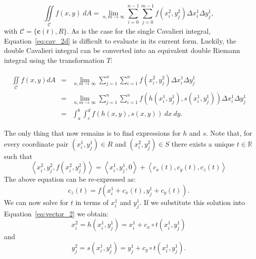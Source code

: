 \documentclass{article}
\theoremstyle{theorem}
\theoremstyle{definition}
\begin{document}
\begin{equation}
\label{eq:cav_2d}
\iint \limits_{\mathcal{C}} f(x,y)~dA = \lim_{n,m \rightarrow \infty}  \sum_{i=0}^{n-1} \sum_{j=0}^{m-1} f(x_i^2,y_j^2) \Delta x_i^1 \Delta y_j^1,
\end{equation}
with $\mathcal{C} = \{\mathbf{c}(t),R\}$. As is the case for the single Cavalieri integral, Equation~\eqref{eq:cav_2d} is difficult to evaluate in its current form. Luckily, the double 
Cavalieri integral can be converted into an equivalent double Riemann integral using the transformation $T$:

\begin{eqnarray}
\iint\limits_{\!\mathcal{C}} f(x,y) dA &=& \lim_{n,m\rightarrow \infty} \sum_{j=1}^n\sum_{i=1}^n f(x_i^2,y_j^2) \Delta x_i^1\Delta y_j^1\\
&=&  \lim_{n,m\rightarrow \infty} \sum_{j=1}^n\sum_{i=1}^n f(h(x_i^1,y_j^1),s(x_i^1,y_j^1)) \Delta x_i^1\Delta y_j^1\\
&=& \int_a^b\int_c^d f(h(x,y),s(x,y))~dx~dy.
\end{eqnarray}

\noindent
The only thing that now remains is to find expressions for $h$ and $s$. Note that, for every coordinate pair $(x_i^1,y_j^1)\in R$ and $(x_i^2,y_j^2)\in S$ there exists a unique $t\in \mathbb{R}$ such that 
\begin{equation}
\label{eq:vector_2}
\left< x_i^2, y_j^2, f(x_i^2,y_j^2) \right > = \left < x_i^1, y_j^1, 0 \right > + \left <c_x(t),c_y(t),c_z(t)\right >  
\end{equation}
The above equation can be re-expressed as:
\begin{equation}
\label{eq:c_z}
c_z(t) = f(x_i^1 + c_x(t),y_j^1 + c_y(t)). 
\end{equation}
We can now solve for $t$ in terms of $x_i^1$ and $y_j^1$. If we substitute this solution into Equation~\ref{eq:vector_2} we obtain:
\begin{equation}
\label{eq:h_2d}
x_i^2 = h(x_i^1,y_j^1) = x_i^1 + c_x\circ t(x_i^1,y_j^1) 
\end{equation}
and 
\begin{equation}
\label{eq:s_2d}
y_j^2 = s(x_i^1,y_j^1) = y_j^1 + c_y\circ t(x_i^1,y_j^1). 
\end{equation}
\end{document}
